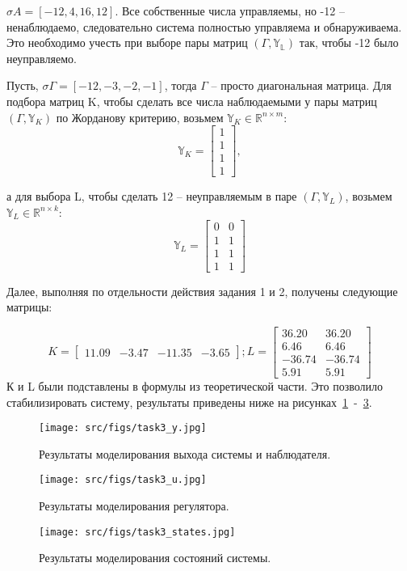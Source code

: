 \(\sigma A = [-12, 4, 16, 12]\). Все собственные числа управляемы, но -12 -- ненаблюдаемо, следовательно система полностью управляема и обнаруживаема. Это необходимо учесть при выборе пары матриц \((\Gamma, \mathds{Y_L})\) так, чтобы -12 было неуправляемо. 

Пусть, \(\sigma \Gamma = [-12, -3, -2, -1]\), тогда \(\Gamma\) -- просто диагональная матрица. Для подбора матриц K, чтобы сделать все числа наблюдаемыми у пары матриц \((\Gamma, \mathds{Y}_K)\) по Жорданову критерию, возьмем \(\mathds{Y}_K \in \mathds{R}^{n \times m}\):
\[\mathds{Y}_K = \begin{bmatrix}
    1\\
    1\\
    1\\
    1
  \end{bmatrix},\]

а для выбора L, чтобы сделать 12 -- неуправляемым в паре \((\Gamma, \mathds{Y}_L)\), возьмем \(\mathds{Y}_L \in \mathds{R}^{n \times k}\):
\[\mathds{Y}_L = \begin{bmatrix}
    0 & 0\\
    1 & 1\\
    1 & 1\\
    1 & 1
  \end{bmatrix}\]

Далее, выполняя по отдельности действия задания 1 и 2, получены следующие матрицы:

\[
    K = \begin{bmatrix}
        11.09 & -3.47 & -11.35 & -3.65
      \end{bmatrix};
    L = \begin{bmatrix}
        36.20 &  36.20\\
        6.46 &  6.46\\
       -36.74 & -36.74\\
        5.91 &  5.91
      \end{bmatrix}
\]
К и L были подставлены в формулы из теоретической части. Это позволило стабилизировать систему, результаты приведены ниже на рисунках~\ref{fig:task3_y}~-~\ref{fig:task3_states}.
\begin{figure}[ht!]
    \centering
    \texttt{[image: src/figs/task3\_y.jpg]}
    \caption{Результаты моделирования выхода системы и наблюдателя.}
    \label{fig:task3_y}
\end{figure}
\begin{figure}[ht!]
    \centering
    \texttt{[image: src/figs/task3\_u.jpg]}
    \caption{Результаты моделирования регулятора.}
    \label{fig:task3_u}
\end{figure}
\begin{figure}[ht!]
    \centering
    \texttt{[image: src/figs/task3\_states.jpg]}
    \caption{Результаты моделирования состояний системы.}
    \label{fig:task3_states}
\end{figure}
